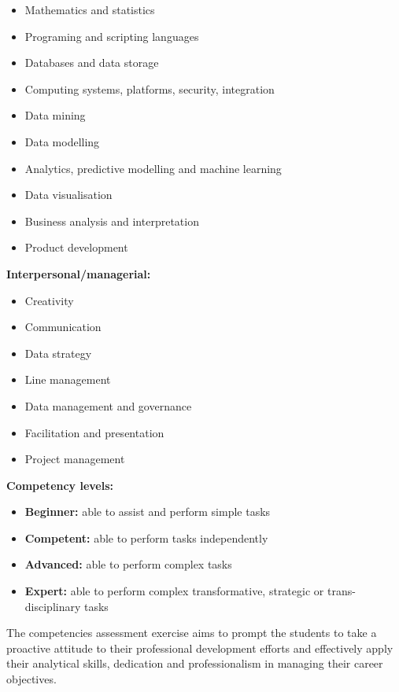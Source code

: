 \documentclass[]{book}
\providecommand{\tightlist}{%
  \setlength{\itemsep}{0pt}\setlength{\parskip}{0pt}}
\theoremstyle{definition}
\theoremstyle{definition}
\theoremstyle{remark}
\begin{document}
\begin{itemize}
\tightlist
\item
  Mathematics and statistics
\item
  Programing and scripting languages
\item
  Databases and data storage
\item
  Computing systems, platforms, security, integration
\item
  Data mining
\item
  Data modelling
\item
  Analytics, predictive modelling and machine learning
\item
  Data visualisation
\item
  Business analysis and interpretation
\item
  Product development
\end{itemize}

\textbf{Interpersonal/managerial:}

\begin{itemize}
\tightlist
\item
  Creativity
\item
  Communication
\item
  Data strategy
\item
  Line management
\item
  Data management and governance
\item
  Facilitation and presentation
\item
  Project management
\end{itemize}

\textbf{Competency levels:}

\begin{itemize}
\tightlist
\item
  \textbf{Beginner:} able to assist and perform simple tasks
\item
  \textbf{Competent:} able to perform tasks independently
\item
  \textbf{Advanced:} able to perform complex tasks
\item
  \textbf{Expert:} able to perform complex transformative, strategic or
  trans-disciplinary tasks
\end{itemize}

The competencies assessment exercise aims to prompt the students to take
a proactive attitude to their professional development efforts and
effectively apply their analytical skills, dedication and
professionalism in managing their career objectives.
\end{document}
